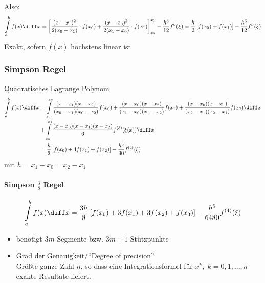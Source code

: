 Also:
\begin{equation}
\int\limits_a^bf(x)\diff x = \left[\frac{(x-x_1)^2}{2(x_0-x_1)}\cdot f(x_0) + \frac{(x-x_0)^2}{2(x_1-x_0)}\cdot f(x_1)\right]_{x_0}^{x_1} - \frac{h^3}{12}f''(\xi) = \frac{h}{2}\left[f(x_0) + f(x_1)\right] - \frac{h^3}{12}f''(\xi)
\end{equation}
Exakt, sofern $f(x)$ höchstens linear ist

\subsubsection{Simpson Regel}
Quadratisches Lagrange Polynom
\begin{equation}
\begin{split}
\int\limits_a^bf(x)\diff x &= \int\limits_{x_0}^{x_2}\frac{(x-x_1)(x-x_2)}{(x_0-x_1)(x_0-x_2)}f(x_0) + \frac{(x-x_0)(x-x_2)}{(x_1-x_0)(x_1-x_2)}f(x_1) + \frac{(x-x_0)(x-x_1)}{(x_2-x_1)(x_2-x_1)}f(x_2)\diff x\\ &+ \int\limits_{x_0}^{x_2}\frac{(x-x_0)(x-x_1)(x-x_2)}{6}f^{(3)}(\xi(x))\diff x\\
&= \frac{h}{3}\left[f(x_0)+4f(x_1)+f(x_2)\right]-\frac{h^5}{90}f^{(4)}(\xi)
\end{split}
\end{equation}
mit $h=x_1-x_0 = x_2-x_1$

\paragraph{Simpson $\frac{3}{8}$ Regel}
\begin{equation}
\int\limits_a^bf(x)\diff x = \frac{3h}{8}\left[f(x_0)+3f(x_1)+3f(x_2)+f(x_3)\right]-\frac{h^5}{6480}f^{(4)}(\xi)
\end{equation}
\begin{itemize}
\item benötigt $3m$ Segmente bzw. $3m+1$ Stützpunkte
\item Grad der Genauigkeit/"`Degree of precision"'\\
Größte ganze Zahl $n$, so dass eine Integrationsformel für $x^k,\; k=0,1,\ldots,n$ exakte Resultate liefert.
\end{itemize}

